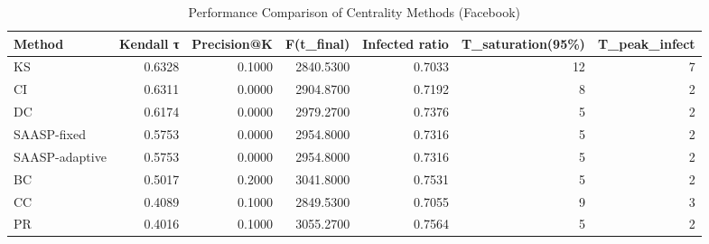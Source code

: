 \begin{table}
\caption{Performance Comparison of Centrality Methods (Facebook)}
\label{tab:facebook_comparison}
\begin{tabular}{lrrrrrr}
\toprule
Method & Kendall τ & Precision@K & F(t\_final) & Infected ratio & T\_saturation(95\%) & T\_peak\_infect \\
\midrule
KS & 0.6328 & 0.1000 & 2840.5300 & 0.7033 & 12 & 7 \\
CI & 0.6311 & 0.0000 & 2904.8700 & 0.7192 & 8 & 2 \\
DC & 0.6174 & 0.0000 & 2979.2700 & 0.7376 & 5 & 2 \\
SAASP-fixed & 0.5753 & 0.0000 & 2954.8000 & 0.7316 & 5 & 2 \\
SAASP-adaptive & 0.5753 & 0.0000 & 2954.8000 & 0.7316 & 5 & 2 \\
BC & 0.5017 & 0.2000 & 3041.8000 & 0.7531 & 5 & 2 \\
CC & 0.4089 & 0.1000 & 2849.5300 & 0.7055 & 9 & 3 \\
PR & 0.4016 & 0.1000 & 3055.2700 & 0.7564 & 5 & 2 \\
\bottomrule
\end{tabular}
\end{table}
